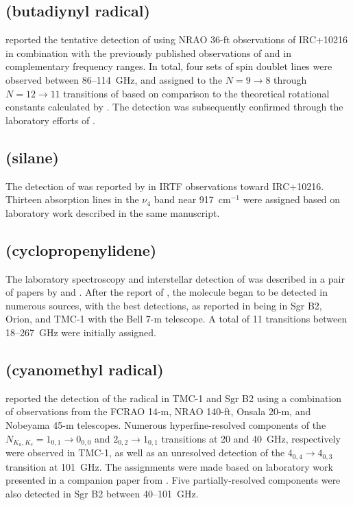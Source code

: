 \documentclass[twocolumn]{aastex631}
\begin{document}
	\subsection{ (butadiynyl radical)}
	\label{C4H}
	
	\citet{Guelin:1978sd} reported the tentative detection of  using NRAO 36-ft observations of IRC+10216 in combination with the previously published observations of \citet{Scoville:1978nq} and \citet{Liszt:1978jl} in complementary frequency ranges.  In total, four sets of spin doublet lines were observed between 86--114~GHz, and assigned to the $N = 9\rightarrow8$ through $N = 12\rightarrow11$ transitions of  based on comparison to the theoretical rotational constants calculated by \citet{Wilson:1977rd}.  The detection was subsequently confirmed through the laboratory efforts of \citet{Gottlieb:1983yd}.
	
	\subsection{ (silane)}
	\label{SiH4}
	
	The detection of  was reported by \citet{Goldhaber:1984mh} in IRTF observations toward IRC+10216.  Thirteen absorption lines in the $\nu_4$ band near 917~cm$^{-1}$ were assigned based on laboratory work described in the same manuscript.
	
	\subsection{ (cyclopropenylidene)}
	\label{c-C3H2}
	
	The laboratory spectroscopy and interstellar detection of  was described in a pair of papers by \citet{Thaddeus:1985hw} and \citet{Vrtilek:1987iu}.  After the report of \citet{Thaddeus:1985hw}, the molecule began to be detected in numerous sources, with the best detections, as reported in \citet{Vrtilek:1987iu} being in Sgr B2, Orion, and TMC-1 with the Bell 7-m telescope.  A total of 11 transitions between 18--267~GHz were initially assigned.  
	
	\subsection{ (cyanomethyl radical)}
	\label{CH2CN}
	
	\citet{Irvine:1988ej} reported the detection of the  radical in TMC-1 and Sgr B2 using a combination of observations from the FCRAO 14-m, NRAO 140-ft, Onsala 20-m, and Nobeyama 45-m telescopes.  Numerous hyperfine-resolved components of the $N_{K_a,K_c} = 1_{0,1}\rightarrow0_{0,0}$ and $2_{0,2}\rightarrow1_{0,1}$ transitions at 20 and 40~GHz, respectively were observed in TMC-1, as well as an unresolved detection of the $4_{0,4}\rightarrow4_{0,3}$ transition at 101~GHz.  The assignments were made based on laboratory work presented in a companion paper from \citet{Saito:1988ba}.  Five partially-resolved components were also detected in Sgr B2 between 40--101~GHz.
	
\end{document}
